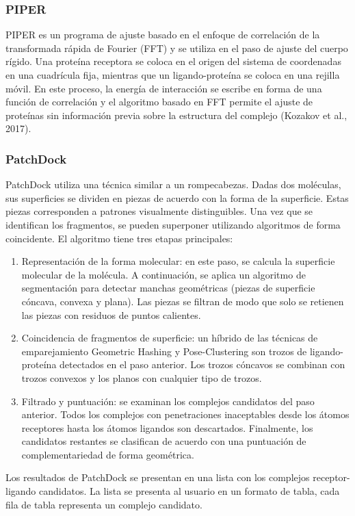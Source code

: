 \documentclass[11pt, letterpaper, spanish]{article}
\begin{document}
{{\subsubsection{PIPER}
\par{ PIPER es un programa de ajuste basado en el enfoque de correlación de la transformada rápida de Fourier (FFT) y se utiliza en el paso de ajuste del cuerpo rígido. Una proteína receptora se coloca en el origen del sistema de coordenadas en una cuadrícula fija, mientras que un ligando-proteína se coloca en una rejilla móvil. En este proceso, la energía de interacción se escribe en forma de una función de correlación y el algoritmo basado en FFT permite el ajuste de proteínas sin información previa sobre la estructura del complejo (Kozakov et al., 2017).}
\subsubsection{PatchDock}
\par{PatchDock utiliza una técnica similar a un rompecabezas. Dadas dos moléculas, sus superficies se dividen en piezas de acuerdo con la forma de la superficie. Estas piezas corresponden a patrones visualmente distinguibles. Una vez que se identifican los fragmentos, se pueden superponer utilizando algoritmos de forma coincidente. El algoritmo tiene tres etapas principales:}
\begin{enumerate}
    \item Representación de la forma molecular: en este paso, se calcula la superficie molecular de la molécula. A continuación, se aplica un algoritmo de segmentación para detectar manchas geométricas (piezas de superficie cóncava, convexa y plana). Las piezas se filtran de modo que solo se retienen las piezas con residuos de puntos calientes.
    \item Coincidencia de fragmentos de superficie: un híbrido de las técnicas de emparejamiento Geometric Hashing y Pose-Clustering son trozos de ligando-proteína detectados en el paso anterior. Los trozos cóncavos se combinan con trozos convexos y los planos con cualquier tipo de trozos.
    \item Filtrado y puntuación: se examinan los complejos candidatos del paso anterior. Todos los complejos con penetraciones inaceptables desde los átomos receptores hasta los átomos ligandos son descartados. Finalmente, los candidatos restantes se clasifican de acuerdo con una puntuación de complementariedad de forma geométrica.
\end{enumerate}
\par{Los resultados de PatchDock se presentan en una lista con los complejos receptor-ligando candidatos. La lista se presenta al usuario en un formato de tabla, cada fila de tabla representa un complejo candidato.}
}}
\end{document}
